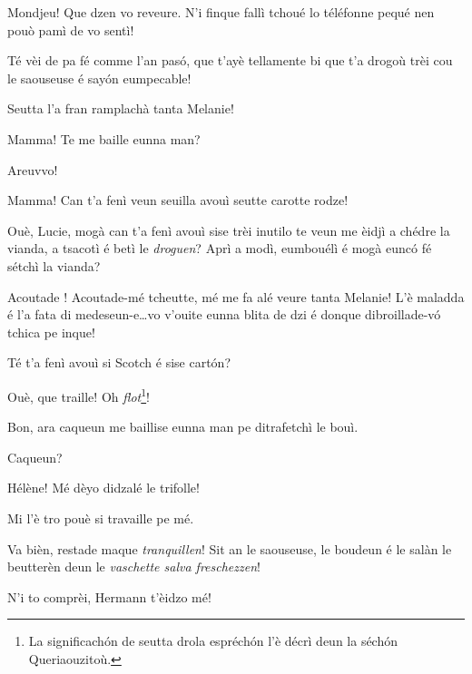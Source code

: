 \begin{drama}
\Luciespeaks Mondjeu! Que dzen vo reveure. N’i finque fallì tchou\-é lo téléfonne pequé nen pouò pamì de vo sentì!


\Luciespeaks{} Té vèi de pa fé comme l'an pas\'o, que t'ayè tellamente bi que t'a drogoù trèi cou le saouseuse é say\'on eumpecable!

\Hermannspeaks{} Seutta l’a fran ramplachà tanta Melanie!

\Remyspeaks{} Mamma! Te me baille eunna man?

\Luciespeaks Areuvvo!

\Helenespeaks  Mamma! Can t'a fenì veun seuilla avouì seutte carotte rodze!

\Hermannspeaks{} Ouè, Lucie,  mogà can t’a fenì a\-vouì sise trèi inutilo te veun me èidjì a chédre la vianda, a tsacotì é betì le \textit{droguen}? Aprì a modì, eumbouélì é mogà eunc\'o fé sétchì la vianda?

\Luciespeaks{} Acoutade \diavolofurioso ! Acoutade-mé tcheutte, mé me fa alé veure tanta Melanie! L'è maladda é l'a fata di medeseun-e\ldots vo v'ouite eunna blita de dzi é donque  dibroillade-v\'o tchica pe inque!


\scene[-- Se comenche!]

\Hermannspeaks{} Té t'a fenì avouì si Scotch é sise cart\'on?

\Cesarspeaks Ouè, que traille! Oh \textit{flot}\footnote{ La significach\'on de seutta drola espréch\'on l'è décrì deun la séch\'on Queriaouzitoù.}!

\Hermannspeaks Bon, ara caqueun me baillise eunna man pe ditrafetchì le bouì.


\Hermannspeaks{} Caqueun?

\Remyspeaks  Hélène! Mé dèyo didzalé le trifolle! 

\Helenespeaks  Mi l'è tro pouè si travaille pe mé.

\Hermannspeaks{} Va bièn, restade maque \textit{tranquillen}! Sit an le saouseuse, le boudeun é le salàn le beutterèn deun le \textit{vaschette salva freschezzen}!

\Cesarspeaks N’i to comprèi, Hermann t'èidzo mé!


\end{drama}
